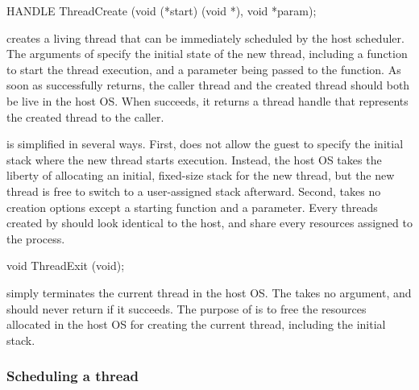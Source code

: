 \begin{paldef}
HANDLE ThreadCreate (void (*start) (void *),
                     void *param);
\end{paldef}


 creates a living thread that can be immediately
scheduled by the host scheduler.
The arguments of  specify the initial state of the new thread, including a function to start the thread execution, and a parameter being passed to the function.
As soon as  successfully returns,
the caller thread and the created thread should both be live in the host OS.
When  succeeds, it returns a thread handle that represents the created thread
to the caller.




 is simplified in several ways.
First,  does not allow the guest to specify
the initial stack where the new thread starts execution.
Instead, the host OS takes the liberty of allocating an initial, fixed-size stack for the new thread,
but the new thread is free to
switch to a user-assigned stack afterward.
Second,  takes no creation options
except a starting function and a parameter.
Every threads created by  should look identical to the host,
and share every resources assigned to the process.



\begin{paldef}
void ThreadExit (void);
\end{paldef}

 simply terminates the current thread in the host OS. The \hostapi{} takes no argument, and should never return if it succeeds.
The purpose of  is to free the resources allocated in the host OS
for creating the current thread, including the initial stack.






\subsubsection*{Scheduling a thread}


